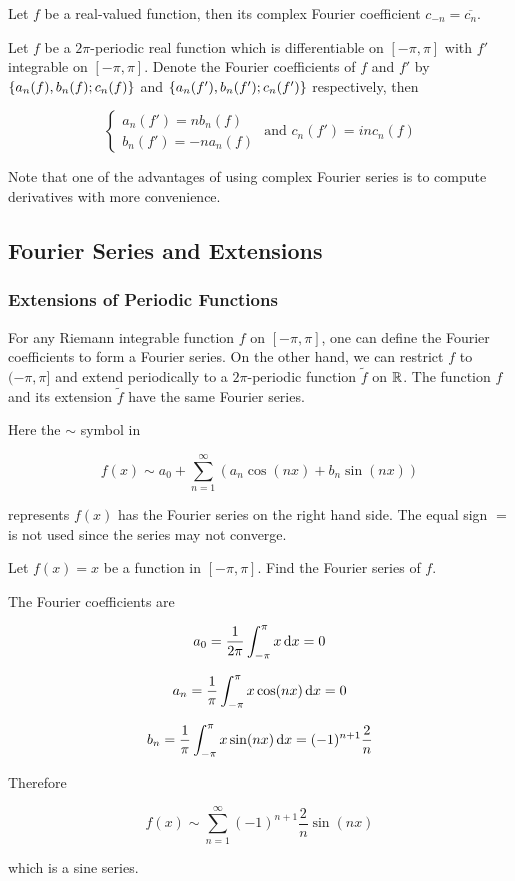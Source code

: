 \documentclass[a4paper,12pt]{article}
\begin{document}
\begin{pst}
  Let $f$ be a real-valued function, then its complex Fourier coefficient $c_{-n}=\overline{c_{n}}$.
\end{pst}\n

\begin{pst}
  Let $f$ be a $2\pi$-periodic real function which is differentiable on $[-\pi,\pi]$ with $f'$ integrable on $[-\pi,\pi]$. Denote the Fourier coefficients of $f$ and $f'$ by $\left\{ a_{n}(f), b_{n}(f); c_{n}(f)\right\}$ and $\left\{ a_{n}(f'), b_{n}(f'); c_{n}(f')\right\}$ respectively, then
  
  $$\begin{cases}
    a_{n}(f')=nb_{n}(f)\\
    b_{n}(f')=-na_{n}(f)
  \end{cases}\text{ and }c_{n}(f')=inc_{n}(f)$$
\end{pst}\n

Note that one of the advantages of using complex Fourier series is to compute derivatives with more convenience.

\subsection{Fourier Series and Extensions}
\subsubsection{Extensions of Periodic Functions}
For any Riemann integrable function $f$ on $[-\pi,\pi]$, one can define the Fourier coefficients to form a Fourier series. On the other hand, we can restrict $f$ to $(-\pi,\pi]$ and extend periodically to a $2\pi$-periodic function $\tilde{f}$ on $\mathbb{R}$. The function $f$ and its extension $\tilde{f}$ have the same Fourier series.\n

Here the $\sim$ symbol in

$$f(x)\sim a_{0}+\sum_{n=1}^{\infty}(a_{n}\cos(nx)+b_{n}\sin(nx))$$\s

represents $f(x)$ has the Fourier series on the right hand side. The equal sign $=$ is not used since the series may not converge.\n

\begin{exm}
  Let $f(x)=x$ be a function in $[-\pi,\pi]$. Find the Fourier series of $f$.\n

  \ans The Fourier coefficients are

  $$a_{0}=\frac{1}{2\pi}\int_{-\pi}^{\pi}x\,\mathrm{d} x=0$$\s

  $$a_{n}=\frac{1}{\pi}\int_{-\pi}^{\pi}x\cos(nx)\,\mathrm{d} x=0$$\s

  $$b_{n}=\frac{1}{\pi}\int_{-\pi}^{\pi}x\sin(nx)\,\mathrm{d} x=(-1)^{n+1}\frac{2}{n}$$\s

  Therefore

  $$f(x)\sim\sum_{n=1}^{\infty}(-1)^{n+1}\frac{2}{n}\sin(nx)$$\s

  which is a sine series.
\end{exm}\n
\end{document}
